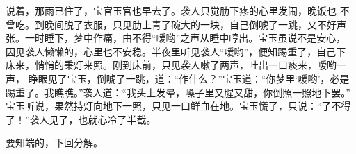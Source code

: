 说着，那雨已住了，宝官玉官也早去了。袭人只觉肋下疼的心里发闹，晚饭也
不曾吃。到晚间脱了衣服，只见肋上青了碗大的一块，自己倒唬了一跳，又不好声
张。一时睡下，梦中作痛，由不得“嗳哟”之声从睡中哼出。宝玉虽说不是安心，
因见袭人懒懒的，心里也不安稳。半夜里听见袭人“嗳哟”，便知踢重了，自己下
床来，悄悄的秉灯来照。刚到床前，只见袭人嗽了两声，吐出一口痰来，嗳哟一声，
睁眼见了宝玉，倒唬了一跳，道：“作什么？”宝玉道：“你梦里‘嗳哟’，必是
踢重了。我瞧瞧。”袭人道：“我头上发晕，嗓子里又腥又甜，你倒照一照地下罢。”
宝玉听说，果然持灯向地下一照，只见一口鲜血在地。宝玉慌了，只说：“了不得
了！”袭人见了，也就心冷了半截。

要知端的，下回分解。